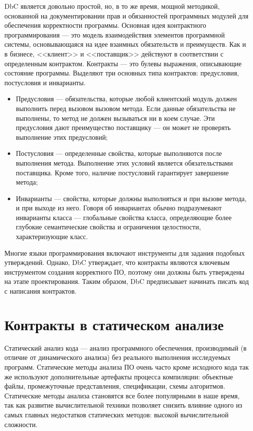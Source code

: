 DbC является довольно простой, но, в то же время, мощной методикой, основанной на документировании прав и обязанностей программных модулей для обеспечения корректности программы. Основная идея контрактного программирования --- это модель взаимодействия элементов программной системы, основывающаяся на идее взаимных обязательств и преимуществ. Как и в бизнесе, <<клиент>> и <<поставщик>> действуют в соответствии с определенным контрактом. Контракты --- это булевы выражения, описывающие состояние программы. Выделяют три основных типа контрактов: предусловия, постусловия и инварианты.
\begin{itemize}
\item Предусловия --- обязательства, которые любой клиентский модуль должен выполнить перед вызовом вызовом метода. Если данные обязательства не выполнены, то метод не должен вызываться ни в коем случае. Эти предусловия дают преимущество поставщику --- он может не проверять выполнение этих предусловий;

\item Постусловия --- определенные свойства, которые выполняются после выполнения метода. Выполнение этих условий является обязательствами поставщика. Кроме того, наличие постусловий гарантирует завершение метода;

\item Инварианты --- свойства, которые должны выполняться и при вызове метода, и при выходе из него. Говоря об инвариантах обычно подразумевают инварианты класса --- глобальные свойства класса, определяющие более глубокие семантические свойства и ограничения целостности, характеризующие класс.
\end{itemize}

Многие языки программирования включают инструменты для задания подобных утверждений. Однако, DbC утверждает, что контракты являются ключевым инструментом создания корректного ПО, поэтому они должны быть утверждены на этапе проектирования. Таким образом, DbC предписывает начинать писать код с написания контрактов.

\section{Контракты в статическом анализе}
Статический анализ кода --- анализ программного обеспечения, производимый (в отличие от динамического анализа) без реального выполнения исследуемых программ. Статические методы анализа ПО очень часто кроме исходного кода так же используют дополнительные артефакты процесса компиляции: объектные файлы, промежуточные представления, спецификации, схемы алгоритмов. Статические методы анализа становятся все более популярными в наше время, так как развитие вычислительной техники позволяет снизить влияние одного из самых главных недостатков статических методов: высокой вычислительной сложности.

